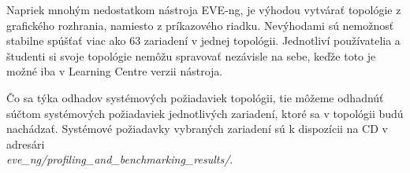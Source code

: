 Napriek mnohým nedostatkom nástroja EVE-ng, je výhodou vytvárať topológie z grafického rozhrania, namiesto z príkazového riadku. Nevýhodami sú nemožnosť stabilne spúšťať viac ako 63 zariadení v jednej topológii. Jednotliví používatelia a študenti si svoje topológie nemôžu spravovať nezávisle na sebe, keďže toto je možné iba v Learning Centre verzii nástroja.

Čo sa týka odhadov systémových požiadaviek topológii, tie môžeme odhadnúť súčtom systémových požiadaviek jednotlivých zariadení, ktoré sa v topológii budú nachádzať. Systémové požiadavky vybraných zariadení sú k dispozícii na CD v adresári \\ \emph{eve\_ng/profiling\_and\_benchmarking\_results/}.